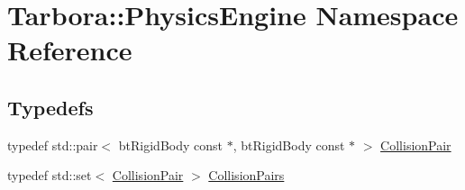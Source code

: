 \hypertarget{namespaceTarbora_1_1PhysicsEngine}{}\section{Tarbora\+:\+:Physics\+Engine Namespace Reference}
\label{namespaceTarbora_1_1PhysicsEngine}
\subsection*{Typedefs}
\begin{DoxyCompactItemize}
\item 
typedef std\+::pair$<$ bt\+Rigid\+Body const $\ast$, bt\+Rigid\+Body const $\ast$ $>$ \hyperlink{namespaceTarbora_1_1PhysicsEngine_a4f1d409d44b0a7cde617d3a30ed02b02}{Collision\+Pair}
\item 
typedef std\+::set$<$ \hyperlink{namespaceTarbora_1_1PhysicsEngine_a4f1d409d44b0a7cde617d3a30ed02b02}{Collision\+Pair} $>$ \hyperlink{namespaceTarbora_1_1PhysicsEngine_af696c3b94fb96f65c63f51e52b0e7238}{Collision\+Pairs}
\end{DoxyCompactItemize}
